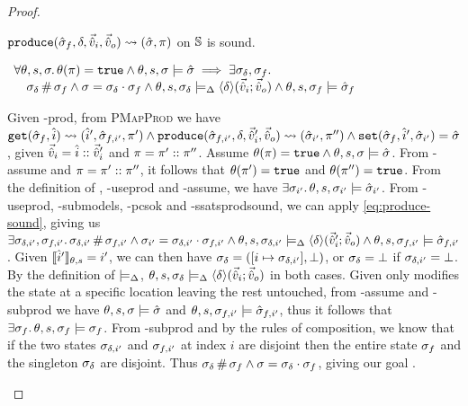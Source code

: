 \begin{proof}

\pfassume \begin{hypvlist}
 $\texttt{produce}(\hat{\sigma}_f,\delta,\vec{\hat{v}}_i,\vec{\hat{v}}_o)\rightsquigarrow (\hat{\sigma}, \pi)$
 \produce{} on $\mathbb S$ is sound.
\end{hypvlist}
\pfprove \begin{goalvlist}
 $\begin{array}{l}
\forall\theta,s,\sigma\ldotp \theta(\pi)=\texttt{true} \land \theta,s,\sigma\models\hat{\sigma} \implies \exists \sigma_\delta, \sigma_f\ldotp \\
\quad \sigma_\delta\operatorname{\#}\sigma_f \land \sigma=\sigma_\delta\cdot\sigma_f \land \theta,s,\sigma_\delta \models_{\Delta} \left<\delta\right>\!(\vec{\hat{v}}_i;\vec{\hat{v}}_o) \land \theta,s,\sigma_f \models \hat{\sigma}_f
\end{array}$
\end{goalvlist}

\pfcase{$\delta \in \preds_\mmdl$}

\begin{hypvlist}
 Given \hyp{prod}, from \textsc{PMapProd} we have $\texttt{get}(\hat{\sigma}_f,\hat{i})\rightsquigarrow(\hat{i}',\hat{\sigma}_{f,i'},\pi') \land \texttt{produce}(\hat{\sigma}_{f,i'},\delta,\vec{\hat{v}}_i',\vec{\hat{v}}_o)\rightsquigarrow (\hat{\sigma}_{i'},\pi'') \land \texttt{set}(\hat{\sigma}_f,\hat{i}',\hat{\sigma}_{i'})=\hat{\sigma}$, given $\vec{\hat{v}}_i=\hat{i}::\vec{\hat{v}}_i'$ and $\pi=\pi'::\pi''$.
 Assume $\theta(\pi)=\texttt{true} \land \theta,s,\sigma\models\hat{\sigma}$.
 From \hyp{assume} and $\pi=\pi'::\pi''$, it follows that $\theta(\pi')=\texttt{true}$ and $\theta(\pi'')=\texttt{true}$.
 From the definition of , \hyp{useprod} and \hyp{assume}, we have $\exists \sigma_{i'}\ldotp \theta,s,\sigma_{i'}\models \hat{\sigma}_{i'}$.
 From \hyp{useprod}, \hyp{submodels}, \hyp{pcsok} and \hyp{ssatsprodsound}, we can apply \ref{eq:produce-sound}, giving us $\exists \sigma_{\delta,i'}, \sigma_{f,i'}\ldotp \sigma_{\delta,i'}\operatorname{\#}\sigma_{f,i'} \land \sigma_{i'}=\sigma_{\delta,i'}\cdot\sigma_{f,i'} \land \theta,s,\sigma_{\delta,i'}\models_{\Delta} \left<\delta\right>\!(\vec{\hat{v}}_i';\vec{\hat{v}}_o) \land \theta,s,\sigma_{f,i'}\models\hat{\sigma}_{f,i'}$.
 Given $\llbracket\hat{i}'\rrbracket_{\theta,s}=i'$, we can then have $\sigma_\delta=([i\mapsto \sigma_{\delta,i'}], \bot)$, or $\sigma_\delta=\bot$ if $\sigma_{\delta,i'}=\bot$. By the definition of $\models_{\Delta}$, $\theta,s,\sigma_\delta\models_{\Delta}\left<\delta\right>\!(\vec{\hat{v}}_i;\vec{\hat{v}}_o)$ in both cases.
 Given  only modifies the state at a specific location leaving the rest untouched, from \hyp{assume} and \hyp{subprod} we have $\theta,s,\sigma\models\hat{\sigma}$ and $\theta,s,\sigma_{f,i'}\models\hat{\sigma}_{f,i'}$, thus it follows that $\exists \sigma_f\ldotp \theta,s,\sigma_f\models\sigma_f$.
 From \hyp{subprod} and by the rules of composition, we know that if the two states $\sigma_{\delta,i'}$ and $\sigma_{f,i'}$ at index $i$ are disjoint then the entire state $\sigma_f$ and the singleton $\sigma_\delta$ are disjoint. Thus $\sigma_\delta\operatorname{\#}\sigma_f\land\sigma=\sigma_\delta\cdot\sigma_f$, giving our goal .
\end{hypvlist}


\end{proof}
